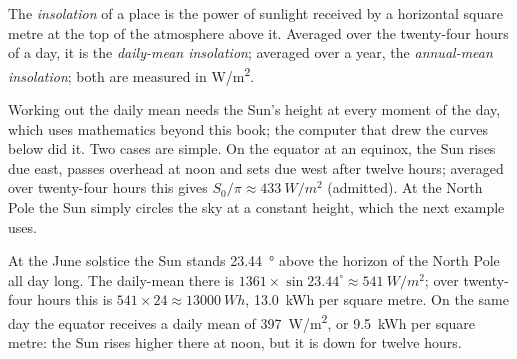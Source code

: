 \begin{definition}[Insolation]\label{def:g10:earth-energy-budget:insolation}
The \emph{insolation} of a place is the power of sunlight
received by a horizontal square metre at the top of the atmosphere above
it. Averaged over the twenty-four hours of a day, it is the \emph{daily-mean
insolation}; averaged over a year, the \emph{annual-mean insolation}; both
are measured in \unit{W/m^2}.
\end{definition}

Working out the daily mean needs the Sun's height at every moment of the day,
which uses mathematics beyond this book; the computer that drew the
curves below did it. Two cases are simple. On
the equator at an equinox, the Sun rises due east, passes overhead at noon
and sets due west after twelve hours; averaged over twenty-four hours this
gives $S_0/\pi \approx \qty{433}{W/m^2}$ (admitted). At the North Pole the
Sun simply circles the sky at a constant height, which the next example
uses.

\begin{example}\label{ex:g10:earth-energy-budget:pole}
At the June solstice the Sun stands \qty{23.44}{\degree} above the horizon
of the North Pole all day long. The daily-mean  there is $1361
\times \sin 23.44^\circ \approx \qty{541}{W/m^2}$; over twenty-four hours
this is $541 \times 24 \approx \qty{13000}{Wh}$, \qty{13.0}{kWh} per square
metre. On the same day the equator receives a daily mean of
\qty{397}{W/m^2}, or \qty{9.5}{kWh} per square metre: the Sun rises higher
there at noon, but it is down for twelve hours.
\end{example}


